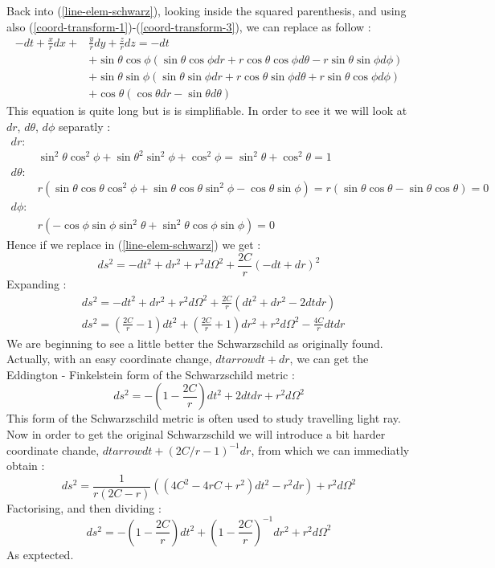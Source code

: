 \documentclass[a4paper,12pt]{article}
\theoremstyle{definition}
\begin{document}
Back into (\ref{line-elem-schwarz}), looking inside the squared parenthesis, and using also (\ref{coord-transform-1})-(\ref{coord-transform-3}), we can replace as follow :
\begin{align*}
	-dt+\frac{x}{r}dx+&\frac{y}{r}dy+\frac{z}{r}dz =-dt\\
	&+\sin{\theta} \cos{\phi} (\sin{\theta} \cos{\phi} dr+r\cos{\theta} \cos{\phi} d\theta -r\sin{\theta} \sin{\phi} d\phi )\\
	&+\sin{\theta} \sin{\phi} (\sin{\theta} \sin{\phi} dr+r\cos{\theta} \sin{\phi} d\theta +r\sin{\theta} \cos{\phi} d\phi )\\
	&+\cos{\theta} (\cos{\theta} dr-\sin{\theta} d\theta )
\end{align*}
This equation is quite long but is is simplifiable. In order to see it  we will look at $dr$, $d\theta$, $d\phi$ separatly :
\begin{align*}
	dr :& \\
	&\sin^2{\theta}\cos^2{\phi}+\sin{\theta}^2\sin^2{\phi}+\cos^2{\phi}=\sin^2{\theta}+\cos^2{\theta}=1\\
	d\theta :& \\
	&r(\sin{\theta}\cos{\theta}\cos^2{\phi}+\sin{\theta}\cos{\theta}\sin^2{\phi}-\cos{\theta}\sin{\phi})=r(\sin{\theta}\cos{\theta}-\sin{\theta}\cos{\theta})=0\\
	d\phi :& \\
	&r(-\cos{\phi}\sin{\phi}\sin^2{\theta}+\sin^2{\theta}\cos{\phi}\sin{\phi})=0
\end{align*}
Hence if we replace in (\ref{line-elem-schwarz}) we get :
\begin{equation*}
	ds^2=-dt^2+dr^2+r^2d\Omega^2+\frac{2C}{r}(-dt+dr)^2
\end{equation*}
Expanding :
\begin{align*}
	&ds^2=-dt^2+dr^2+r^2d\Omega^2+\frac{2C}{r}(dt^2+dr^2-2dtdr)\\
	&ds^2=(\frac{2C}{r}-1)dt^2+(\frac{2C}{r}+1)dr^2+r^2d\Omega^2-\frac{4C}{r}dtdr
\end{align*}
We are beginning to see a little better the Schwarzschild as originally found.
Actually, with an easy coordinate change, $dtarrow dt+dr$, we can get the Eddington - Finkelstein form of the Schwarzschild metric :
\begin{equation}
	ds^2=-(1-\frac{2C}{r})dt^2+2dtdr+r^2d\Omega^2
\end{equation}
This form of the Schwarzschild metric is often used to study travelling light ray.
Now in order to get the original Schwarzschild we will introduce a bit harder coordinate chande, $dtarrow dt+(2C/r-1)^{-1}dr$, from which we can immediatly obtain :
\begin{equation*}
	ds^2=\frac{1}{r(2C-r)}((4C^2-4rC+r^2)dt^2-r^2dr)+r^2d\Omega^2
\end{equation*}
Factorising, and then dividing :
\begin{equation}
	ds^2=-(1-\frac{2C}{r})dt^2+(1-\frac{2C}{r})^{-1}dr^2+r^2d\Omega^2
\end{equation}
As exptected.
\end{document}
